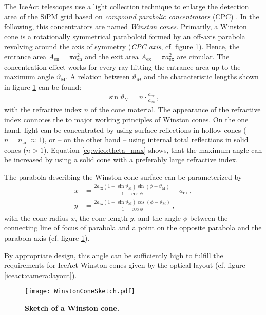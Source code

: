 The IceAct telescopes use a light collection technique to enlarge the detection area of the SiPM grid based on \textit{compound parabolic concentrators} (CPC) \cite{wico:book}. In the following, this concentrators are named \textit{Winston cones}. 
Primarily, a Winston cone is a rotationally symmetrical paraboloid formed by an off-axis parabola revolving around the axis of symmetry (\textit{CPC axis}, cf. figure \ref{iceact:camera:wico_sketch}). Hence, the entrance area $A_\text{en}=\pi a_\text{en}^2$ and the exit area $A_\text{ex}=\pi a_\text{ex}^2$ are circular. The concentration effect works for every ray hitting the entrance area up to the maximum angle $\vartheta_\text{M}$. A relation between $\vartheta_M$ and the characteristic lengths shown in figure \ref{iceact:camera:wico_sketch} can be found: \cite{wico:book,iceact:camera}
\begin{align}
	\sin\vartheta_\text{M} = n\cdot\frac{a_\text{ex}}{a_\text{en}}\,,
	\label{eq:wico:theta_max}
\end{align}
with the refractive index $n$ of the cone material. The appearance of the refractive index connotes the to major working principles of Winston cones. On the one hand, light can be concentrated by using surface reflections in hollow cones ($n=n_\text{air}\approx 1$), or -- on the other hand -- using internal total reflections in solid cones ($n>1$). Equation \eqref{eq:wico:theta_max} shows, that the maximum angle can be increased by using a solid cone with a preferably large refractive index.

The parabola describing the Winston cone surface can be parameterized by \cite{wico:book,iceact:camera}
\begin{align}
	x &= \frac{2a_\text{ex}(1+\sin\vartheta_\text{M})\sin(\phi-\vartheta_\text{M})}{1-\cos\phi}-a_\text{ex}\,,\\
	y &= \frac{2a_\text{ex}(1+\sin\vartheta_\text{M})\cos(\phi-\vartheta_\text{M})}{1-\cos\phi}\,,
\end{align}
with the cone radius $x$, the cone length $y$, and the angle $\phi$ between the connecting line of focus of parabola and a point on the opposite parabola and the parabola axis (cf. figure \ref{iceact:camera:wico_sketch}).

By appropriate design, this angle can be sufficiently high to fulfill the requirements for IceAct Winston cones given by the optical layout (cf. figure \ref{iceact:camera:layout}).


\begin{figure}
	\centering
	\texttt{[image: WinstonConeSketch.pdf]}
	\caption[Sketch of a Winston cone]{\textbf{Sketch of a Winston cone.} \cite{iceact:camera}}
	\label{iceact:camera:wico_sketch}	
\end{figure}

